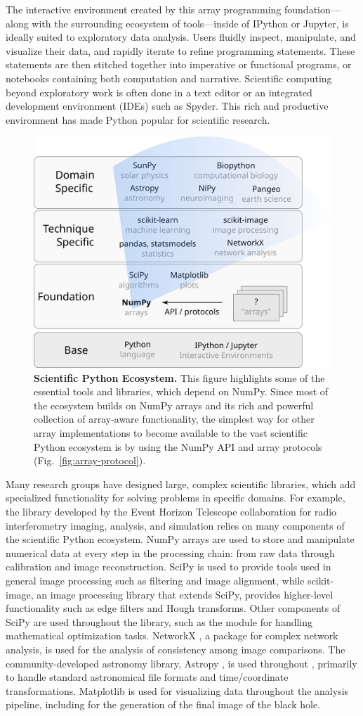 The interactive environment created by this array programming
foundation---along with the surrounding ecosystem of tools---inside of
IPython or Jupyter, is ideally suited to exploratory data analysis.
Users fluidly inspect, manipulate, and visualize their data, and
rapidly iterate to refine programming statements. These statements are
then stitched together into imperative or functional programs, or
notebooks containing both computation and narrative.
Scientific computing beyond exploratory work is often done in a text editor
or an integrated development environment (IDEs) such as Spyder.
This rich and productive environment has made Python popular
for scientific research.

\begin{figure}
  \centering
  \includegraphics[width=.45\textwidth]{static/sketches/ecosystem}
  \caption{\textbf{Scientific Python Ecosystem.}
   This figure highlights some of the essential tools and libraries, which depend
   on NumPy.  Since most of the ecosystem
   builds on NumPy arrays and its rich and powerful collection of array-aware
   functionality, the simplest way for other array implementations to become
   available to the vast scientific Python ecosystem is by using the NumPy API and array
   protocols (Fig.~\ref{fig:array-protocol}).
  }
  \label{fig:ecosystem}
\end{figure}

Many research groups have designed large,
complex scientific libraries, which add specialized functionality for
solving problems in specific domains.
For example, the  library developed by the Event Horizon Telescope 
collaboration for radio interferometry imaging, analysis, and simulation
relies on many components of the scientific Python ecosystem.
NumPy arrays are used to store and manipulate numerical data at every step
in the processing chain: from raw data through calibration and image
reconstruction.
SciPy is used to provide tools used in general image processing such as
filtering and image alignment, while scikit-image, an image processing
library that extends SciPy, provides higher-level functionality such as
edge filters and Hough transforms.
Other components of SciPy are used throughout the library, such as the
 module for handling mathematical optimization tasks.
NetworkX \cite{SciPyProceedings_11}, a package for complex
network analysis, is used for the analysis of consistency among image
comparisons.
The community-developed astronomy library, Astropy \cite{astropy:2013, astropy:2018},
is used throughout , primarily to handle standard
astronomical file formats and time/coordinate transformations.
Matplotlib is used for visualizing data throughout the analysis pipeline,
including for the generation of the final image of the black hole.

